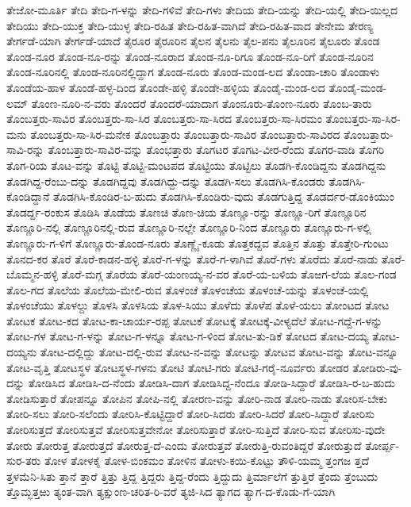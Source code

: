 ತೇಜೋ-ಮೂರ್ತಿ
ತೇದಿ
ತೇದಿ-ಗ-ಳನ್ನು
ತೇದಿ-ಗಳಿವೆ
ತೇದಿ-ಗಳು
ತೇದಿಯ
ತೇದಿ-ಯನ್ನು
ತೇದಿ-ಯಲ್ಲಿ
ತೇದಿ-ಯಿಲ್ಲದ
ತೇದಿಯು
ತೇದಿ-ಯುಕ್ತ
ತೇದಿ-ಯುಳ್ಳ
ತೇದಿ-ರಹಿತ
ತೇದಿ-ರಹಿತ-ವಾಗಿದೆ
ತೇದಿ-ರಹಿತ-ವಾದ
ತೇನೇಮ
ತೇರಣ್ಯ
ತೇರ್ಗಡೆ-ಯಾಗಿ
ತೇರ್ಗಡೆ-ಯಾದೆ
ತೈರೂರ
ತೈರೂರಿನ
ತೈಲನ
ತೈಲನು
ತೈಲ-ಪನು
ತೈಲೂರಿನ
ತೈಲೂರು
ತೊಂಡ
ತೊಂಡ-ನೂರ
ತೊಂಡ-ನೂ-ರನ್ನು
ತೊಂಡ-ನೂರಾದ
ತೊಂಡ-ನೂ-ರಿಗೂ
ತೊಂಡ-ನೂ-ರಿಗೆ
ತೊಂಡ-ನೂರಿನ
ತೊಂಡ-ನೂರಿನಲ್ಲಿ
ತೊಂಡ-ನೂರಿನಲ್ಲಿದ್ದಾಗ
ತೊಂಡ-ನೂರು
ತೊಂಡ-ಮಂಡ-ಲದ
ತೊಂಡಾ-ಚಾರಿ
ತೊಂಡಾಳು
ತೊಂಡೆಯ-ಹಾಳ
ತೊಂಡೆ-ಹಳ್ಳ-ದಿಂದ
ತೊಂಡೇ-ಹಳ್ಳಿ
ತೊಂಡೇ-ಹಳ್ಳಿಯ
ತೊಂಡೈ-ಮಂಡ-ಲದ
ತೊಂಡೈ-ಮಂಡ-ಲಮ್
ತೊಂಣ-ನೂರಿ-ನ-ವರು
ತೊಂದರೆ
ತೊಂದರೆ-ಯಾದಾಗ
ತೊಂನೂರು-ತೊಂಣ-ನೂರು
ತೊಂಬ-ತಾರು
ತೊಂಬತ್ತರು-ಸಾವಿರ
ತೊಂಬತ್ತರು-ಸಾ-ಸಿರ
ತೊಂಬತ್ತರು-ಸಾ-ಸಿರದ
ತೊಂಬತ್ತರು-ಸಾ-ಸಿರಮಂ
ತೊಂಬತ್ತರು-ಸಾ-ಸಿರ-ಮನು
ತೊಂಬತ್ತರು-ಸಾ-ಸಿರ-ಮನೇಕ
ತೊಂಬತ್ತಾರು
ತೊಂಬತ್ತಾರು-ಸಾವಿರ
ತೊಂಬತ್ತಾರು-ಸಾವಿರದ
ತೊಂಬತ್ತಾರು-ಸಾವಿ-ರನ್ನು
ತೊಂಬತ್ತಾರು-ಸಾವಿರ-ವನ್ನು
ತೊಂಭತ್ತಾರು
ತೊಗಟರ
ತೊಗಟ-ವೀರ-ರೆಂದು
ತೊಗರ-ವಾಡಿ
ತೊಗರಿ
ತೊಗ-ರಿಯ
ತೊಟ-ವನ್ನು
ತೊಟ್ಟಿ
ತೊಟ್ಟಿ-ಮಂಟಪದ
ತೊಟ್ಟಿಯು
ತೊಟ್ಟಿಲು
ತೊಡಗಿ-ಕೊಂಡಿದ್ದನು
ತೊಡಗಿದ್ದನು
ತೊಡಗಿದ್ದ-ರೆಂಬು-ದನ್ನು
ತೊಡಗಿದ್ದವು
ತೊಡಗಿದ್ದು-ದನ್ನು
ತೊಡಗಿ-ಸಲು
ತೊಡಗಿಸಿ-ಕೊಂಡರು
ತೊಡಗಿಸಿ-ಕೊಂಡಿದ್ದಾನೆ
ತೊಡಗಿಸಿ-ಕೊಂಡಿರ-ಬ-ಹುದು
ತೊಡಗಿಸಿ-ಕೊಂಡಿರು-ವುದು
ತೊಡಗುತ್ತಿದ್ದ
ತೊಡರ್ದರ-ಡೊಂಕಿಯುಂ
ತೊಡರ್ದ್ದ-ರಂಕುಸ
ತೊಡಿಸಿ
ತೊಡೆಯ
ತೊಣಚಿ
ತೊಣ-ಚಿಯ
ತೊಣ್ಣೂ-ರನ್ನು
ತೊಣ್ಣೂ-ರಿಗೆ
ತೊಣ್ಣೂರಿನ
ತೊಣ್ಣೂರಿ-ನಲ್ಲಿ
ತೊಣ್ಣೂರಿನಲ್ಲಿ-ರುವ
ತೊಣ್ಣೂರಿ-ನಲ್ಲೇ
ತೊಣ್ಣೂರಿ-ನಿಂದ
ತೊಣ್ಣೂರು
ತೊಣ್ಣೂರು-ಗ-ಳಲ್ಲಿ
ತೊಣ್ಣೂರು-ಗ-ಳಿಗೆ
ತೊಣ್ಣೂರು-ತೊಂಡ-ನೂರು
ತೊಣ್ಣೈ-ಕೂಡು
ತೊತ್ತಕದ್ದವ
ತೊತ್ತಿನ
ತೊತ್ತು
ತೊತ್ತೇರಿ-ಗುಂಟು
ತೊನದ-ಕರ
ತೊರೆ
ತೊರೆ-ಕಾಡನ-ಹಳ್ಳಿ
ತೊರೆ-ಗ-ಳನ್ನು
ತೊರೆ-ಗ-ಳಾಗಿವೆ
ತೊರೆ-ಗಳು
ತೊರೆದು
ತೊರೆ-ನಾಡು
ತೊರೆ-ಬೊಮ್ಮನ-ಹಳ್ಳಿ
ತೊರೆ-ಮಗ್ಗ
ತೊರೆಯ
ತೊರೆ-ಯಂಣಯ್ಯ-ನ-ವರ
ತೊರೆ-ಯ-ಬಳಿಯ
ತೊಱಗ-ಲೆಯ
ತೊಲ-ಗಂಡ
ತೊಲ-ಗದ
ತೊಲೆಯ
ತೊಲೆಯ-ಮೇಲಿ-ರುವ
ತೊಳಂಚೆ
ತೊಳಂಚೆಯ
ತೊಳಂಚೆ-ಯನ್ನು
ತೊಳಂಚೆ-ಯಲ್ಲಿ
ತೊಳಂಚೆಯು
ತೊಳಲ್ದು
ತೊಳಸಿ
ತೊಳಸಿಯ
ತೊಳ-ಸಿಯು
ತೊಳೆದು
ತೊಳೆಪ
ತೊಳೆ-ಯಲು
ತೋಂಟದ
ತೋಟ
ತೋಟಕ
ತೋಟ-ಕದ
ತೋಟ-ಕಾ-ಚಾರ್ಯ-ರಪ್ಪ
ತೋಟಕೆ
ತೋಟಕ್ಕೆ
ತೋಟಕ್ಕೆ-ವೀಳ್ಯದೆಲೆ
ತೋಟ-ಗದ್ದೆ-ಗ-ಳನ್ನು
ತೋಟ-ಗಳ
ತೋಟ-ಗ-ಳನ್ನು
ತೋಟ-ಗ-ಳನ್ನೂ
ತೋಟ-ಗ-ಳಿಂದ
ತೋಟ-ತು-ಡಿಕೆ
ತೋಟದ
ತೋಟ-ದಯ್ಯ
ತೋಟ-ದಯ್ಯನು
ತೋಟ-ದಲ್ಲಿದ್ದು
ತೋಟ-ದಲ್ಲಿ-ರುವ
ತೋಟ-ನ-ವನ್ನು
ತೋಟನ್ನು
ತೋಟವ
ತೋಟ-ವನ್ನು
ತೋಟ-ವನ್ನೂ
ತೋಟ-ವೃತ್ತಿ
ತೋಟಸ್ಥಳ
ತೋಟಸ್ಥಳ-ಗಳನು
ತೋಟಿ
ತೋಟಿ-ಗರು
ತೋಟಿ-ಗರೈ-ನೂರ್ವರು
ತೋಡರ
ತೋಡಿರು-ವು-ದನ್ನು
ತೋಡಿಸಿದ
ತೋಡಿಸಿ-ದ-ನೆಂದು
ತೋಡಿಸಿ-ದಾಗ
ತೋಡಿಸಿದ್ದ-ನೆಂದೂ
ತೋಡಿ-ಸಿದ್ದಾರೆ
ತೋಡಿಸಿ-ರ-ಬ-ಹುದು
ತೋಡಿಸುತ್ತಾರೆ
ತೋಪನ್ನೂ
ತೋಪಿನ
ತೋಪಿ-ನಲ್ಲಿ
ತೋರಣ-ವನ್ನು
ತೋರಿ-ನಾಡ
ತೋರಿ-ನಾಡು
ತೋರಿಸ-ಬೇಕು
ತೋರಿ-ಸಲು
ತೋರಿ-ಸಲೆಂದು
ತೋರಿಸಿ-ಕೊಟ್ಟಿದ್ದಾರೆ
ತೋರಿ-ಸಿದರು
ತೋರಿ-ಸಿದರೆ
ತೋರಿ-ಸಿದ್ದಾರೆ
ತೋರಿಸು
ತೋರಿಸುತ್ತದೆ
ತೋರಿಸುತ್ತವೆ
ತೋರಿಸುತ್ತವೇನೋ
ತೋರಿಸುತ್ತಾರೆ
ತೋರಿ-ಸುತ್ತಿದೆ
ತೋರಿ-ಸುವ
ತೋರಿಸು-ವುದೇ
ತೋರು
ತೋರುತ್ತ
ತೋರುತ್ತದೆ
ತೋರುತ್ತ-ದೆ-ಎಂದು
ತೋರುತ್ತವೆ
ತೋರುತ್ತಿ-ರುವಂತಿದ್ದರೆ
ತೋರುತ್ತುದೆ
ತೋರ್ಪ್ಪ-ಸುರ-ತರು
ತೋಳ
ತೋಳಕೈ
ತೋಳ-ಬಿಂಕಮಂ
ತೋಳಿನ
ತೋಳು-ಕಯಿ-ಕೊಟ್ಟು
ತೌಳಿ-ಯಮ್ಮ
ತ್ತಂಗಜ
ತ್ತದೆ
ತ್ತಳಮೆನಿ-ಸಿತು
ತ್ತಾನೆ
ತ್ತಾರೆ
ತ್ತಿತ್ತು
ತ್ತಿದ್ದ
ತ್ತಿದ್ದರು
ತ್ತಿದ್ದ-ರೆಂದು
ತ್ತಿದ್ದುದು
ತ್ತಿರ್ಮಾಲೆಗೆ
ತ್ತುತ್ತಿರೆ
ತ್ತೆಂದು
ತ್ತೆಂಬುದು
ತ್ತೊಮ್ಭತ್ತಱು
ತ್ಯಂತ-ವಾಗಿ
ತ್ಯಕ್ಷುಂಣ-ಚರಿತ-ರಿ-ವರೆ
ತ್ಯಜಿ-ಸಿದ
ತ್ಯಾಗದ
ತ್ಯಾಗ-ದ-ಕೊಡು-ಗೆ-ಯಾಗಿ
